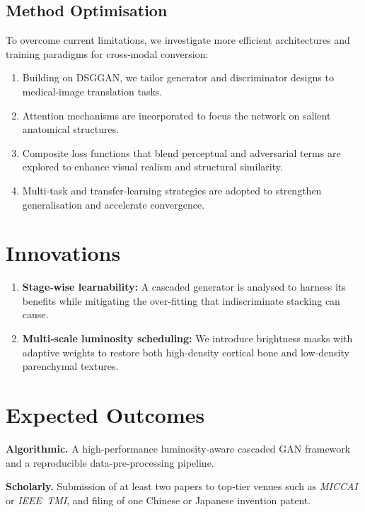 \documentclass[twocolumn]{article}
\begin{document}
\subsection{Method Optimisation}
To overcome current limitations, we investigate more efficient architectures and training paradigms for cross‑modal conversion:
\begin{enumerate}
	\item Building on DSGGAN, we tailor generator and discriminator designs to medical‑image translation tasks.
	\item Attention mechanisms are incorporated to focus the network on salient anatomical structures.
	\item Composite loss functions that blend perceptual and adversarial terms are explored to enhance visual realism and structural similarity.
	\item Multi‑task and transfer‑learning strategies are adopted to strengthen generalisation and accelerate convergence.
\end{enumerate}

\section{Innovations}
\begin{enumerate} \item \textbf{Stage‑wise learnability:} A cascaded generator is analysed to harness its benefits while mitigating the over‑fitting that indiscriminate stacking can cause.
	\item \textbf{Multi‑scale luminosity scheduling:} We introduce brightness masks with adaptive weights to restore both high‑density cortical bone and low‑density parenchymal textures.
\end{enumerate}

\section{Expected Outcomes}
\textbf{Algorithmic.} A high‑performance luminosity‑aware cascaded GAN framework and a reproducible data‑pre‑processing pipeline.

\textbf{Scholarly.} Submission of at least two papers to top‑tier venues such as \emph{MICCAI} or \emph{IEEE TMI}, and filing of one Chinese or Japanese invention patent.








\end{document}
